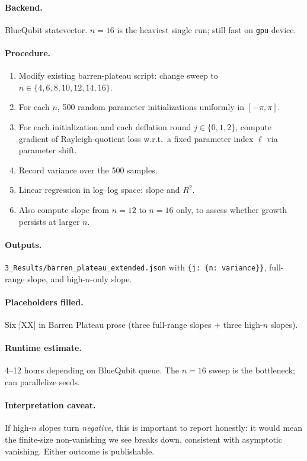\documentclass[11pt]{article}
\begin{document}
\paragraph*{Backend.} BlueQubit statevector. $n=16$ is the heaviest
single run; still fast on \texttt{gpu} device.

\paragraph*{Procedure.}
\begin{enumerate}[leftmargin=*]
  \item Modify existing barren-plateau script: change sweep to
        $n \in \{4, 6, 8, 10, 12, 14, 16\}$.
  \item For each $n$, 500 random parameter initializations uniformly
        in $[-\pi, \pi]$.
  \item For each initialization and each deflation round
        $j \in \{0, 1, 2\}$, compute gradient of Rayleigh-quotient
        loss w.r.t.\ a fixed parameter index $\ell$ via parameter
        shift.
  \item Record variance over the 500 samples.
  \item Linear regression in log--log space: slope and $R^2$.
  \item Also compute slope from $n=12$ to $n=16$ only, to assess
        whether growth persists at larger $n$.
\end{enumerate}

\paragraph*{Outputs.}
\texttt{3\_Results/barren\_plateau\_extended.json} with
\texttt{\{j: \{n: variance\}\}}, full-range slope, and
high-$n$-only slope.

\paragraph*{Placeholders filled.} Six [XX] in Barren Plateau
prose (three full-range slopes + three high-$n$ slopes).

\paragraph*{Runtime estimate.} 4--12 hours depending on BlueQubit
queue. The $n=16$ sweep is the bottleneck; can parallelize seeds.

\paragraph*{Interpretation caveat.} If high-$n$ slopes turn
\emph{negative}, this is important to report honestly: it would
mean the finite-size non-vanishing we see breaks down, consistent
with asymptotic vanishing. Either outcome is publishable.
\end{document}
